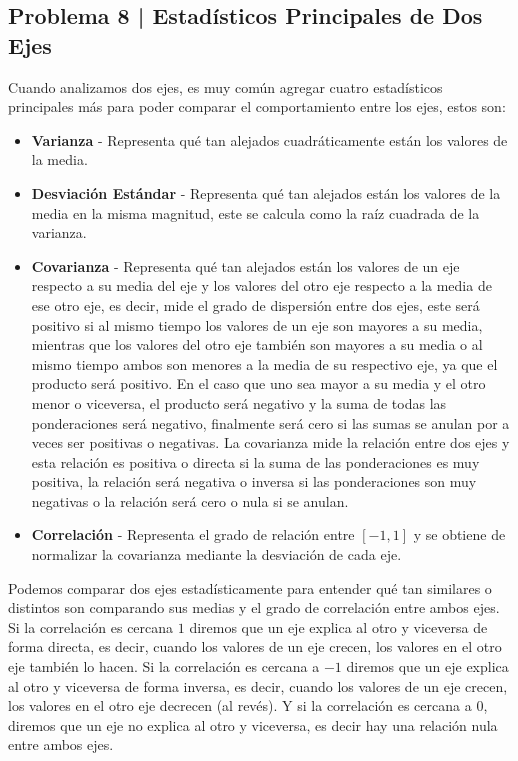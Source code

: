 \documentclass{article}
\begin{document}
\clearpage

\subsection*{Problema 8 | Estadísticos Principales de Dos Ejes }

Cuando analizamos dos ejes, es muy común agregar cuatro estadísticos principales más para poder comparar el comportamiento entre los ejes, estos son:
\begin{itemize}
    \item \textbf{Varianza} - Representa qué tan alejados cuadráticamente están los valores de la media.
    \item \textbf{Desviación Estándar} - Representa qué tan alejados están los valores de la media en la misma magnitud, este se calcula como la raíz cuadrada de la varianza.
    \item \textbf{Covarianza} - Representa qué tan alejados están los valores de un eje respecto a su media del eje y los valores del otro eje respecto a la media de ese otro eje, es decir, mide el grado de dispersión entre dos ejes, este será positivo si al mismo tiempo los valores de un eje son mayores a su media, mientras que los valores del otro eje también son mayores a su media o al mismo tiempo ambos son menores a la media de su respectivo eje, ya que el producto será positivo. En el caso que uno sea mayor a su media y el otro menor o viceversa, el producto será negativo y la suma de todas las ponderaciones será negativo, finalmente será cero si las sumas se anulan por a veces ser positivas o negativas. La covarianza mide la relación entre dos ejes y esta relación es positiva o directa si la suma de las ponderaciones es muy positiva, la relación será negativa o inversa si las ponderaciones son muy negativas o la relación será cero o nula si se anulan.
    \item \textbf{Correlación} - Representa el grado de relación entre $[-1, 1]$ y se obtiene de normalizar la covarianza mediante la desviación de cada eje.
\end{itemize}
Podemos comparar dos ejes estadísticamente para entender qué tan similares o distintos son comparando sus medias y el grado de correlación entre ambos ejes. Si la correlación es cercana $1$ diremos que un eje explica al otro y viceversa de forma directa, es decir, cuando los valores de un eje crecen, los valores en el otro eje también lo hacen. Si la correlación es cercana a $-1$ diremos que un eje explica al otro y viceversa de forma inversa, es decir, cuando los valores de un eje crecen, los valores en el otro eje decrecen (al revés). Y si la correlación es cercana a $0$, diremos que un eje no explica al otro y viceversa, es decir hay una relación nula entre ambos ejes.
\end{document}
